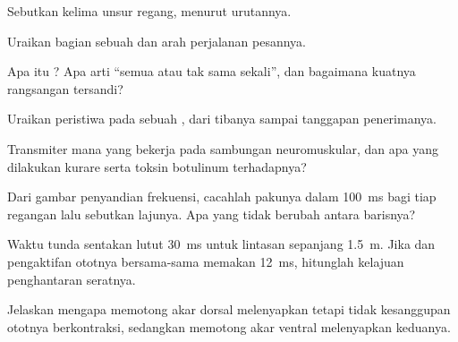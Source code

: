 \begin{exercise}[$\star$]\label{exo:g12:stretch-reflex:1}
Sebutkan kelima unsur  regang, menurut urutannya.
\end{exercise}

\begin{exercise}[$\star$]\label{exo:g12:stretch-reflex:2}
Uraikan bagian sebuah  dan arah perjalanan pesannya.
\end{exercise}

\begin{exercise}[$\star$]\label{exo:g12:stretch-reflex:3}
Apa itu ? Apa arti ``semua atau tak sama sekali'', dan
bagaimana kuatnya rangsangan tersandi?
\end{exercise}

\begin{exercise}[$\star$]\label{exo:g12:stretch-reflex:4}
Uraikan peristiwa pada sebuah , dari tibanya 
sampai tanggapan  penerimanya.
\end{exercise}

\begin{exercise}[$\star$]\label{exo:g12:stretch-reflex:5}
Transmiter mana yang bekerja pada sambungan neuromuskular, dan apa yang
dilakukan kurare serta toksin botulinum terhadapnya?
\end{exercise}

\begin{exercise}[$\star\star$]\label{exo:g12:stretch-reflex:6}
Dari gambar penyandian frekuensi, cacahlah pakunya dalam \qty{100}{ms}
bagi tiap regangan lalu sebutkan lajunya. Apa yang tidak berubah antara
barisnya?
\end{exercise}

\begin{exercise}[$\star\star$]\label{exo:g12:stretch-reflex:7}
Waktu tunda sentakan lutut \qty{30}{ms} untuk lintasan sepanjang
\qty{1.5}{m}. Jika  dan pengaktifan ototnya bersama-sama
memakan \qty{12}{ms}, hitunglah kelajuan penghantaran seratnya.
\end{exercise}

\begin{exercise}[$\star\star$]\label{exo:g12:stretch-reflex:8}
Jelaskan mengapa memotong akar dorsal melenyapkan  tetapi
tidak kesanggupan ototnya berkontraksi, sedangkan memotong akar ventral
melenyapkan keduanya.
\end{exercise}

